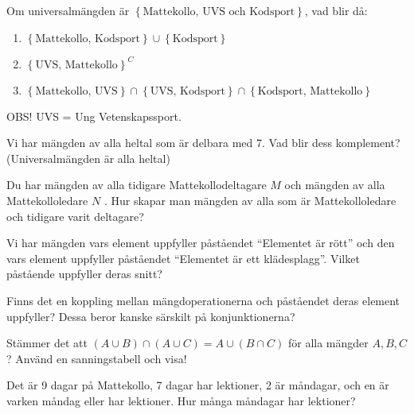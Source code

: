 \begin{problem}
	Om universalmängden är \(\left\{\text{Mattekollo, UVS och Kodsport} \right\}\), vad blir då:
	\begin{enumerate}[label=\alph*)]
		\item \(\left\{\text{Mattekollo, Kodsport} \right\} \cup \left\{\text{Kodsport} \right\}\) 
		\item \(\left\{\text{UVS, Mattekollo}\right\}^C\) 
		\item \(\left\{\text{Mattekollo, UVS}\right\} \cap \left\{\text{UVS, Kodsport} \right\} \cap \left\{\text{Kodsport, Mattekollo} \right\}\) 
	\end{enumerate}
	
	OBS! UVS = Ung Vetenskapssport.
\end{problem}

\begin{problem}
	Vi har mängden av alla heltal som är delbara med 7. Vad blir dess komplement? (Universalmängden är alla heltal)
\end{problem}

\begin{problem}
	Du har mängden av alla tidigare Mattekollodeltagare \(M\)  och mängden av alla Mattekolloledare \(N\) . Hur skapar man mängden av alla som är Mattekolloledare och tidigare varit deltagare?
\end{problem}

\begin{problem}
	Vi har mängden vars element uppfyller påståendet ``Elementet är rött'' och den vars element uppfyller påståendet ``Elementet är ett klädesplagg''. Vilket påstående uppfyller deras snitt?
\end{problem}

\begin{problem}
	Finns det en koppling mellan mängdoperationerna och påståendet deras element uppfyller? Dessa beror kanske särskilt på konjunktionerna?
\end{problem}

\begin{problem}
	Stämmer det att \((A \cup B) \cap (A \cup C) = A \cup (B \cap C)\) för alla mängder \(A, B, C\)? Använd en sanningstabell och visa!
\end{problem}

\begin{problem}[Extra]
	Det är 9 dagar på Mattekollo, 7 dagar har lektioner, 2 är måndagar, och en är varken måndag eller har lektioner. Hur många måndagar har lektioner?
\end{problem}

